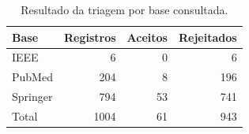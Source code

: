 \begin{table}[!htb]
\centering
\caption{Resultado da triagem por base consultada.}
\label{tab:revisao_sistematica_triagem}
\small
\begin{tabular}{lrrr}
\toprule
Base & Registros & Aceitos & Rejeitados \\
\midrule
IEEE & 6 & 0 & 6 \\
PubMed & 204 & 8 & 196 \\
Springer & 794 & 53 & 741 \\
\midrule
Total & 1004 & 61 & 943 \\
\bottomrule
\end{tabular}
\normalsize
\end{table}
